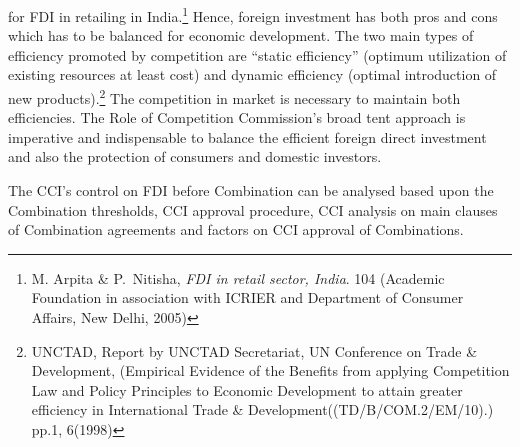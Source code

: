 \begin{multicols}{2}
for FDI in retailing in India.\footnote{M. Arpita \& P.\ Nitisha, \textit{FDI in retail sector, India}. 104 (Academic Foundation in association with ICRIER and
Department of Consumer Affairs, New Delhi, 2005)} Hence, foreign investment has both pros and cons which has to
be balanced for economic development. The two main types of efficiency promoted by
competition are “static efficiency” (optimum utilization of existing resources at least cost)
and dynamic efficiency (optimal introduction of new products).\footnote{UNCTAD, Report by UNCTAD Secretariat, UN Conference on Trade \& Development, (Empirical Evidence
of the Benefits from applying Competition Law and Policy Principles to Economic Development to attain
greater efficiency in International Trade \& Development((TD/B/COM.2/EM/10).) pp.1, 6(1998)} The competition in market
is necessary to maintain both efficiencies. The Role of Competition Commission's broad tent
approach is imperative and indispensable to balance the efficient foreign direct investment
and also the protection of consumers and domestic investors.



\vspace{-.15cm}

\noi
The CCI’s control on FDI before Combination can be analysed based upon the Combination
thresholds, CCI approval procedure, CCI analysis on main clauses of Combination
agreements and factors on CCI approval of Combinations.

\vspace{-.15cm}


\vspace{-.15cm}


\end{multicols}
